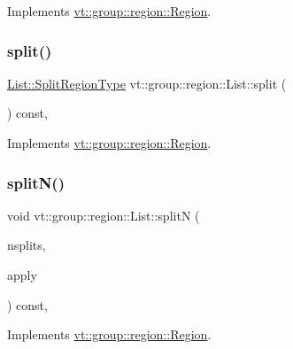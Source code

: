 Implements \hyperlink{structvt_1_1group_1_1region_1_1_region_a169304bf82a87ff958333595bed2603d}{vt\+::group\+::region\+::\+Region}.

\mbox{\label{structvt_1_1group_1_1region_1_1_list_a0f8352e79bb541ad17ea80843a363304}} 
\subsubsection{\texorpdfstring{split()}{split()}}
{\footnotesize\ttfamily \hyperlink{structvt_1_1group_1_1region_1_1_region_ab8d05c0978c7f38292a9ed5a15498a4b}{List\+::\+Split\+Region\+Type} vt\+::group\+::region\+::\+List\+::split (\begin{DoxyParamCaption}{ }\end{DoxyParamCaption}) const\hspace{0.3cm}{\ttfamily [override]}, {\ttfamily [virtual]}}



Implements \hyperlink{structvt_1_1group_1_1region_1_1_region_a2cbbbff6358f0f63235d95501858f512}{vt\+::group\+::region\+::\+Region}.

\mbox{\label{structvt_1_1group_1_1region_1_1_list_ad1950419288564d76527c24bd6d4f3a3}} 
\subsubsection{\texorpdfstring{split\+N()}{splitN()}}
{\footnotesize\ttfamily void vt\+::group\+::region\+::\+List\+::splitN (\begin{DoxyParamCaption}\item[{int}]{nsplits,  }\item[{\hyperlink{structvt_1_1group_1_1region_1_1_region_a7c9e99b1157d2fe2f3e6fc36a1463a96}{Apply\+Fn\+Type}}]{apply }\end{DoxyParamCaption}) const\hspace{0.3cm}{\ttfamily [override]}, {\ttfamily [virtual]}}



Implements \hyperlink{structvt_1_1group_1_1region_1_1_region_ae8660d4218b57e91664dedfa807cd936}{vt\+::group\+::region\+::\+Region}.

